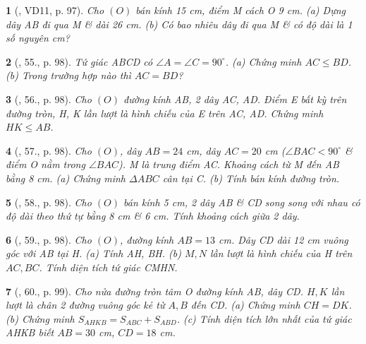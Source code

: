 \documentclass{article}
\newtheorem{baitoan}{}
\begin{document}
\begin{baitoan}[\cite{Binh_Toan_9_tap_1}, VD11, p. 97]
	Cho $(O)$ bán kính {\rm15 cm}, điểm M cách O {\rm9 cm}. (a) Dựng dây AB đi qua M \& dài {\rm26 cm}. (b) Có bao nhiêu dây đi qua M \& có độ dài là 1 số nguyên {\rm cm}?
\end{baitoan}

\begin{baitoan}[\cite{Binh_Toan_9_tap_1}, 55., p. 98]
	Tứ giác ABCD có $\angle{A} = \angle{C} = 90^\circ$. (a) Chứng minh $AC\le BD$. (b) Trong trường hợp nào thì $AC = BD$?
\end{baitoan}

\begin{baitoan}[\cite{Binh_Toan_9_tap_1}, 56., p. 98]
	Cho $(O)$ đường kính AB, 2 dây AC, AD. Điểm E bất kỳ trên đường tròn, H, K lần lượt là hình chiếu của E trên AC, AD. Chứng minh $HK\le AB$.
\end{baitoan}

\begin{baitoan}[\cite{Binh_Toan_9_tap_1}, 57., p. 98]
	Cho $(O)$, dây $AB = 24$ {\rm cm}, dây $AC = 20$ {\rm cm} ($\angle{BAC} < 90^\circ$ \& điểm O nằm trong $\angle{BAC}$). M là trung điểm AC. Khoảng cách từ M đến AB bằng {\rm8 cm}. (a) Chứng minh $\Delta ABC$ cân tại C. (b) Tính bán kính đường tròn.
\end{baitoan}

\begin{baitoan}[\cite{Binh_Toan_9_tap_1}, 58., p. 98]
	Cho $(O)$ bán kính {\rm5 cm}, 2 dây AB \& CD song song với nhau có độ dài theo thứ tự bằng {\rm8 cm} \& {\rm6 cm}. Tính khoảng cách giữa 2 dây.
\end{baitoan}

\begin{baitoan}[\cite{Binh_Toan_9_tap_1}, 59., p. 98]
	Cho $(O)$, đường kính $AB = 13$ {\rm cm}. Dây CD dài {\rm 12 cm} vuông góc với AB tại H. (a) Tính AH, BH. (b) $M,N$ lần lượt là hình chiếu của H trên $AC,BC$. Tính diện tích tứ giác CMHN.
\end{baitoan}

\begin{baitoan}[\cite{Binh_Toan_9_tap_1}, 60., p. 99]
	Cho nửa đường tròn tâm O đường kính AB, dây CD. $H,K$ lần lượt là chân 2 đường vuông góc kẻ từ $A,B$ đến CD. (a) Chứng minh $CH = DK$. (b) Chứng minh $S_{AHKB} = S_{ABC} + S_{ABD}$. (c) Tính diện tích lớn nhất của tứ giác AHKB biết $AB = 30$ {\rm cm}, $CD = 18$ {\rm cm}.
\end{baitoan}
\end{document}
